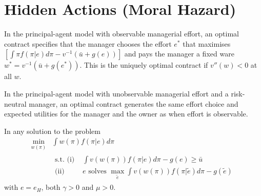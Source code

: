\addtocounter{section}{1}

\section{Hidden Actions (Moral Hazard)}

\begin{prop}
    In the principal-agent model with observable managerial effort, an optimal contract specifies that the manager chooses the effort $e^*$ that maximises $\left[ \int \pi f(\pi | e) d \pi - v^{-1}(\bar{u} + g(e))\right]$ and pays the manager a fixed ware $w^* = v^{-1}(\bar{u} + g(e^*))$. This is the uniquely optimal contract if $v''(w) < 0$ at all $w$.
\end{prop}

\begin{prop}
    In the principal-agent model with unobservable managerial effort and a risk-neutral manager, an optimal contract generates the same effort choice and expected utilities for the manager and the owner as when effort is observable.
\end{prop}

\begin{lem}
    In any solution to the problem
    \begin{equation*}
        \begin{aligned}
            \min_{w(\pi)} &\int w(\pi) f(\pi | e) d \pi \\
            &\begin{aligned}
                \text{s.t. (i) } &\int v\left(w(\pi)\right) f(\pi |e) d \pi - g(e) \geq \bar{u} \\
                \text{(ii) } &e \text{ solves } \max_{\tilde{e}} \int v\left(w(\pi)\right) f(\pi | \tilde{e}) d \pi - g(\tilde{e})
            \end{aligned}
        \end{aligned}
    \end{equation*}
    with $e = e_H$, both $\gamma > 0$ and $\mu > 0$.
\end{lem}

